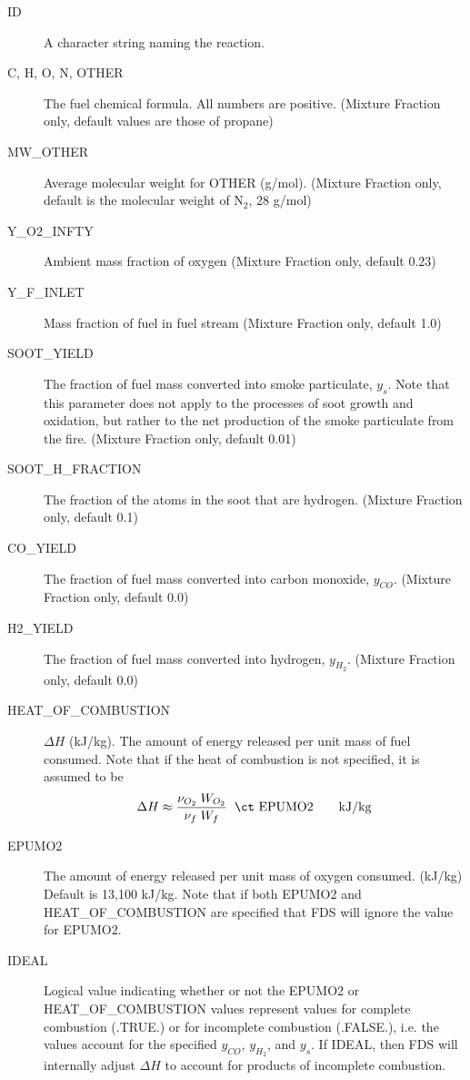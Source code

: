 \documentclass[11pt]{book}
\begin{document}
\begin{description}
\item[{\ct ID}] A character string naming the reaction.
\item[{\ct C, H, O, N, OTHER}] The fuel chemical formula. All numbers are positive.
(Mixture Fraction only, default values are those of propane)
\item[{\ct MW\_OTHER}] Average molecular weight for {\ct OTHER} (g/mol).
(Mixture Fraction only, default is the molecular weight of N$_2$, 28 g/mol)
\item[{\ct Y\_O2\_INFTY}] Ambient mass fraction of oxygen (Mixture Fraction only, default 0.23)
\item[{\ct Y\_F\_INLET}] Mass fraction of fuel in fuel stream (Mixture Fraction only, default 1.0)
\item[{\ct SOOT\_YIELD}] The fraction of fuel mass converted into smoke particulate, $y_s$.
Note that this parameter does not apply to the processes of soot growth and oxidation,
but rather to the net production of the smoke particulate from the fire.  (Mixture Fraction only, default 0.01)
\item[{\ct SOOT\_H\_FRACTION}] The fraction of the atoms in the soot that are hydrogen.
(Mixture Fraction only, default 0.1)
\item[{\ct CO\_YIELD}] The fraction of fuel mass converted into carbon
monoxide, $y_{CO}$. (Mixture Fraction only, default 0.0)
\item[{\ct H2\_YIELD}] The fraction of fuel mass converted into hydrogen, $y_{H_2}$. (Mixture Fraction only, default 0.0)
\item[{\ct HEAT\_OF\_COMBUSTION}] $\Delta H$ (kJ/kg). The amount of
energy released per unit mass of fuel consumed. Note that if the heat of combustion is not
specified, it is assumed to be
$$ \Delta H \approx \frac{\nu_{O_2} \; W_{O_2} } { \nu_{f} \; W_{f} } \; \;
   \hbox{\ct EPUMO2}  \quad \quad \hbox{kJ/kg}  $$
\item[{\ct EPUMO2}] The amount of energy released per unit mass of oxygen consumed. (kJ/kg)
Default is 13,100 kJ/kg.  Note that if both {\ct EPUMO2} and {\ct HEAT\_OF\_COMBUSTION} are
specified that FDS will ignore the value for {\ct EPUMO2}.
\item[{\ct IDEAL}] Logical value indicating whether or not the {\ct EPUMO2} or {\ct  HEAT\_OF\_COMBUSTION}
values represent values for complete combustion ({\ct .TRUE.}) or for incomplete combustion ({\ct .FALSE.}),
i.e. the values account for the specified $y_{CO}$, $y_{H_2}$, and $y_s$.  If {\ct IDEAL}, then
FDS will internally adjust $\Delta H$ to account for products of incomplete combustion.
\end{description}
\end{document}
